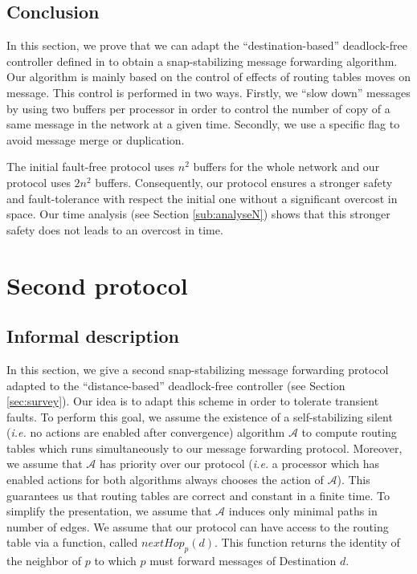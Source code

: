 \documentclass[11pt]{article}
\begin{document}
\subsection{Conclusion}

In this section, we prove that we can adapt the ``destination-based'' deadlock-free controller defined in \cite{MS78} to obtain a snap-stabilizing message forwarding algorithm. Our algorithm is mainly based on the control of effects of routing tables moves on message. This control is performed in two ways. Firstly, we ``slow down'' messages by using two buffers per processor in order to control the number of copy of a same message in the network at a given time. Secondly, we use a specific flag to avoid message merge or duplication.

The initial fault-free protocol uses $n^{2}$ buffers for the whole network and our protocol uses $2n^{2}$ buffers. Consequently, our protocol ensures a stronger safety and fault-tolerance with respect the initial one without a significant overcost in space. Our time analysis (see Section \ref{sub:analyseN}) shows that this stronger safety does not leads to an overcost in time.
 
\section{Second protocol}\label{sec:protocolD}

\subsection{Informal description}

In this section, we give a second snap-stabilizing message forwarding protocol adapted to the ``distance-based'' deadlock-free controller (see Section \ref{sec:survey}). Our idea is to adapt this scheme in order to tolerate transient faults. To perform this goal, we assume the existence of a self-stabilizing silent (\emph{i.e.} no actions are enabled after convergence) algorithm $\mathcal{A}$ to compute routing tables which runs simultaneously to our message forwarding protocol. Moreover, we assume that $\mathcal{A}$ has priority over our protocol (\emph{i.e.} a processor which has enabled actions for both algorithms always chooses the action of $\mathcal{A}$). This guarantees us that routing tables are correct and constant in a finite time. To simplify the presentation, we assume that $\mathcal{A}$ induces only minimal paths in number of edges. We assume that our protocol can have access to the routing table via a function, called $nextHop_{p}(d)$. This function returns the identity of the neighbor of $p$ to which $p$ must forward messages of Destination $d$. 
\end{document}
